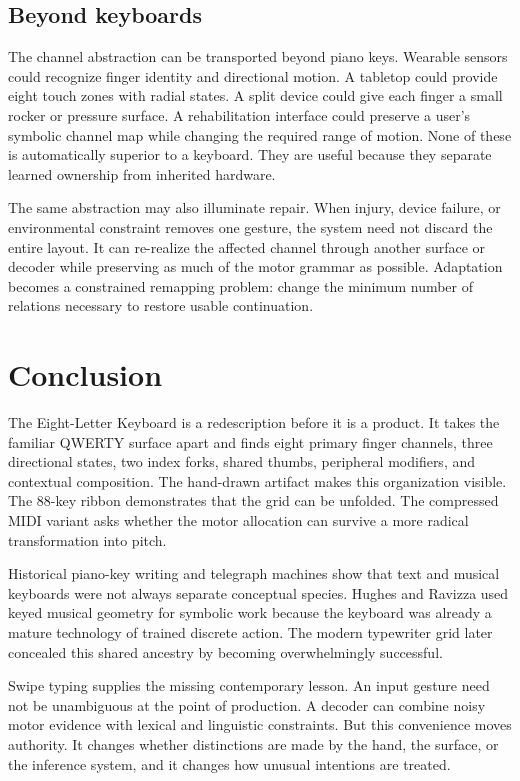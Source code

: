\documentclass[11pt]{article}
\begin{document}
\subsection{Beyond keyboards}

The channel abstraction can be transported beyond piano keys. Wearable sensors could recognize finger identity and directional motion. A tabletop could provide eight touch zones with radial states. A split device could give each finger a small rocker or pressure surface. A rehabilitation interface could preserve a user's symbolic channel map while changing the required range of motion. None of these is automatically superior to a keyboard. They are useful because they separate learned ownership from inherited hardware.

The same abstraction may also illuminate repair. When injury, device failure, or environmental constraint removes one gesture, the system need not discard the entire layout. It can re-realize the affected channel through another surface or decoder while preserving as much of the motor grammar as possible. Adaptation becomes a constrained remapping problem: change the minimum number of relations necessary to restore usable continuation.

\section{Conclusion}

The Eight-Letter Keyboard is a redescription before it is a product. It takes the familiar QWERTY surface apart and finds eight primary finger channels, three directional states, two index forks, shared thumbs, peripheral modifiers, and contextual composition. The hand-drawn artifact makes this organization visible. The 88-key ribbon demonstrates that the grid can be unfolded. The compressed MIDI variant asks whether the motor allocation can survive a more radical transformation into pitch.

Historical piano-key writing and telegraph machines show that text and musical keyboards were not always separate conceptual species. Hughes and Ravizza used keyed musical geometry for symbolic work because the keyboard was already a mature technology of trained discrete action. The modern typewriter grid later concealed this shared ancestry by becoming overwhelmingly successful.

Swipe typing supplies the missing contemporary lesson. An input gesture need not be unambiguous at the point of production. A decoder can combine noisy motor evidence with lexical and linguistic constraints. But this convenience moves authority. It changes whether distinctions are made by the hand, the surface, or the inference system, and it changes how unusual intentions are treated.
\end{document}
